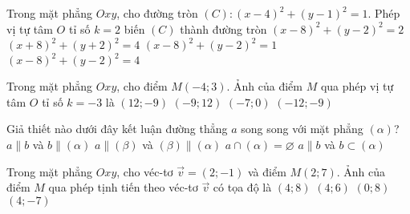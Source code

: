 \begin{ex}%
Trong mặt phẳng $Oxy$, cho đường tròn $(C)\colon (x-4)^2+(y-1)^2=1$. Phép vị tự tâm $O$ tỉ số $k=2$ biến $(C)$ thành đường tròn
\choice
{$(x-8)^2+(y-2)^2=2$}
{$(x+8)^2+(y+2)^2=4$}
{$(x-8)^2+(y-2)^2=1$}
{\True $(x-8)^2+(y-2)^2=4$}
\end{ex}


\begin{ex}%
Trong mặt phẳng $Oxy$, cho điểm $M(-4;3)$. Ảnh của điểm $M$ qua phép vị tự tâm $O$ tỉ số $k=-3$ là
\choice
{\True $(12;-9)$}
{$(-9;12)$}
{$(-7;0)$}
{$(-12;-9)$}
\end{ex}


\begin{ex}%
Giả thiết nào dưới đây kết luận đường thẳng $a$ song song với mặt phẳng $(\alpha)$?
\choice
{$a\parallel b$ và $b\parallel (\alpha)$}
{$a\parallel (\beta)$ và $(\beta)\parallel (\alpha)$}
{$a\cap (\alpha)=\varnothing$}
{$a\parallel b$ và $b\subset (\alpha)$}
\end{ex}


\begin{ex}%
Trong mặt phẳng $Oxy$, cho véc-tơ $\overrightarrow{v}=(2;-1)$ và điểm $M(2;7)$. Ảnh của điểm $M$ qua phép tịnh tiến theo véc-tơ $\overrightarrow{v}$ có tọa độ là
\choice
{$(4;8)$}
{\True $(4;6)$}
{$(0;8)$}
{$(4;-7)$}
\end{ex}


